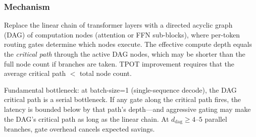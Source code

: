 \documentclass[11pt]{article}
\begin{document}
\subsubsection*{Mechanism}
Replace the linear chain of transformer layers with a directed acyclic graph (DAG) of computation nodes (attention or FFN sub-blocks), where per-token routing gates determine which nodes execute.
The effective compute depth equals the \emph{critical path} through the active DAG nodes, which may be shorter than the full node count if branches are taken.
TPOT improvement requires that the average critical path $< $ total node count.

Fundamental bottleneck: at batch-size=1 (single-sequence decode), the DAG critical path is a serial bottleneck.
If any gate along the critical path fires, the latency is bounded below by that path's depth---and aggressive gating may make the DAG's critical path as long as the linear chain.
At $d_\text{dag} \geq 4$--$5$ parallel branches, gate overhead cancels expected savings.
\end{document}
